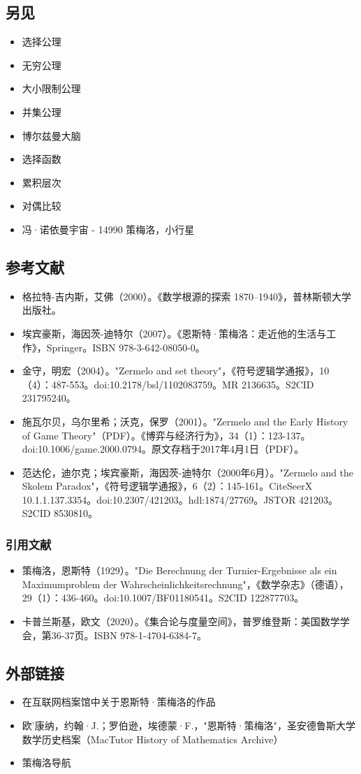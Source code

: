 \subsection{另见}
\begin{itemize}
\item 选择公理
\item 无穷公理
\item 大小限制公理
\item 并集公理
\item 博尔兹曼大脑
\item 选择函数
\item 累积层次
\item 对偶比较
\item 冯·诺依曼宇宙
- 14990 策梅洛，小行星
\end{itemize}
\subsection{参考文献}
\begin{itemize}
\item 格拉特-吉内斯，艾佛（2000）。《数学根源的探索 1870–1940》，普林斯顿大学出版社。
\item 埃宾豪斯，海因茨-迪特尔（2007）。《恩斯特·策梅洛：走近他的生活与工作》，Springer。ISBN 978-3-642-08050-0。
\item 金守，明宏（2004）。"Zermelo and set theory"，《符号逻辑学通报》，10（4）：487-553。doi:10.2178/bsl/1102083759。MR 2136635。S2CID 231795240。
\item 施瓦尔贝，乌尔里希；沃克，保罗（2001）。"Zermelo and the Early History of Game Theory"（PDF）。《博弈与经济行为》，34（1）：123-137。doi:10.1006/game.2000.0794。原文存档于2017年4月1日（PDF）。
\item 范达伦，迪尔克；埃宾豪斯，海因茨-迪特尔（2000年6月）。"Zermelo and the Skolem Paradox"，《符号逻辑学通报》，6（2）：145-161。CiteSeerX 10.1.1.137.3354。doi:10.2307/421203。hdl:1874/27769。JSTOR 421203。S2CID 8530810。
\end{itemize}
\subsubsection{引用文献}
\begin{itemize}
\item 策梅洛，恩斯特（1929）。"Die Berechnung der Turnier-Ergebnisse als ein Maximumproblem der Wahrscheinlichkeitsrechnung"，《数学杂志》（德语），29（1）：436-460。doi:10.1007/BF01180541。S2CID 122877703。
\item 卡普兰斯基，欧文（2020）。《集合论与度量空间》，普罗维登斯：美国数学学会，第36-37页。ISBN 978-1-4704-6384-7。
\end{itemize}
\subsection{外部链接}
\begin{itemize}
\item 在互联网档案馆中关于恩斯特·策梅洛的作品
\item 欧'康纳，约翰·J.；罗伯逊，埃德蒙·F.，"恩斯特·策梅洛"，圣安德鲁斯大学数学历史档案（MacTutor History of Mathematics Archive）
\item 策梅洛导航
\end{itemize}